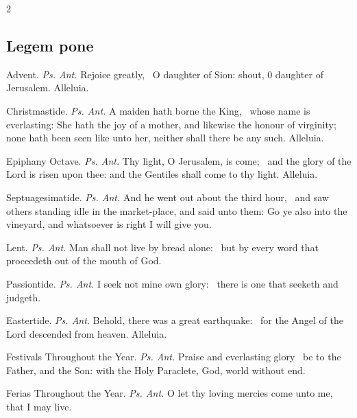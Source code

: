 \begin{multicols}{2}
\subsection{Legem pone}
\par\noindent
{\color{RubricRed}Advent.} \textit{Ps. Ant.} Rejoice greatly,~{\dag} O daughter of Sion: shout, 0 daughter of Jerusalem. Alleluia.
\par\noindent
{\color{RubricRed}Christmastide.} \textit{Ps. Ant.} A maiden hath borne the King,~{\dag} whose name is everlasting: She hath the joy of a mother, and likewise the honour of virginity; none hath been seen like unto her, neither shall there be any such. Alleluia.
\par\noindent
{\color{RubricRed}Epiphany Octave.} \textit{Ps. Ant.} Thy light, O Jerusalem, is come;~{\dag} and the glory of the Lord is risen upon thee: and the Gentiles shall come to thy light. Alleluia.
\par\noindent
{\color{RubricRed}Septuagesimatide.} \textit{Ps. Ant.} And he went out about the third hour,~{\dag} and saw others standing idle in the market-place, and said unto them: Go ye also into the vineyard, and whatsoever is right I will give you.
\par\noindent
{\color{RubricRed}Lent.} \textit{Ps. Ant.} Man shall not live by bread alone:~{\dag} but by every word that proceedeth out of the mouth of God.
\par\noindent
{\color{RubricRed}Passiontide.} \textit{Ps. Ant.} I seek not mine own glory:~{\dag} there is one that seeketh and judgeth.
\par\noindent
{\color{RubricRed}Eastertide.} \textit{Ps. Ant.} Behold, there was a great earthquake:~{\dag} for the Angel of the Lord descended from heaven. Alleluia.
\par\noindent
{\color{RubricRed}Festivals Throughout the Year.} \textit{Ps. Ant.} Praise and everlasting glory~{\dag} be to the Father, and the Son: with the Holy Paraclete, God, world without end.
\par\noindent
{\color{RubricRed}Ferias Throughout the Year.} \textit{Ps. Ant.} O let thy loving mercies come unto me,~{\dag} that I may live.\\


\end{multicols}
